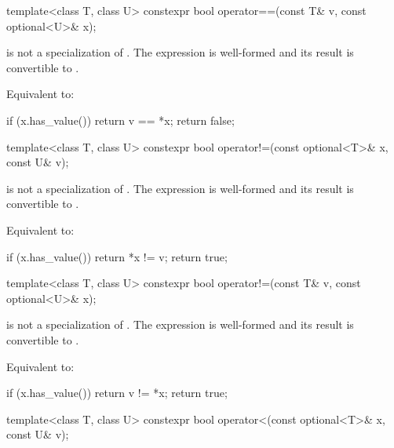 %
\begin{itemdecl}
template<class T, class U> constexpr bool operator==(const T& v, const optional<U>& x);
\end{itemdecl}

\begin{itemdescr}
\pnum
\constraints
{} is not a specialization of .
The expression  is well-formed and
its result is convertible to .

\pnum
\effects
Equivalent to:
\begin{codeblock}
if (x.has_value())
  return v == *x;
return false;
\end{codeblock}
\end{itemdescr}

%
\begin{itemdecl}
template<class T, class U> constexpr bool operator!=(const optional<T>& x, const U& v);
\end{itemdecl}

\begin{itemdescr}
\pnum
\constraints
{} is not a specialization of .
The expression  is well-formed and
its result is convertible to .

\pnum
\effects
Equivalent to:
\begin{codeblock}
if (x.has_value())
  return *x != v;
return true;
\end{codeblock}
\end{itemdescr}

%
\begin{itemdecl}
template<class T, class U> constexpr bool operator!=(const T& v, const optional<U>& x);
\end{itemdecl}

\begin{itemdescr}
\pnum
\constraints
{} is not a specialization of .
The expression  is well-formed and
its result is convertible to .

\pnum
\effects
Equivalent to:
\begin{codeblock}
if (x.has_value())
  return v != *x;
return true;
\end{codeblock}
\end{itemdescr}

%
\begin{itemdecl}
template<class T, class U> constexpr bool operator<(const optional<T>& x, const U& v);
\end{itemdecl}

